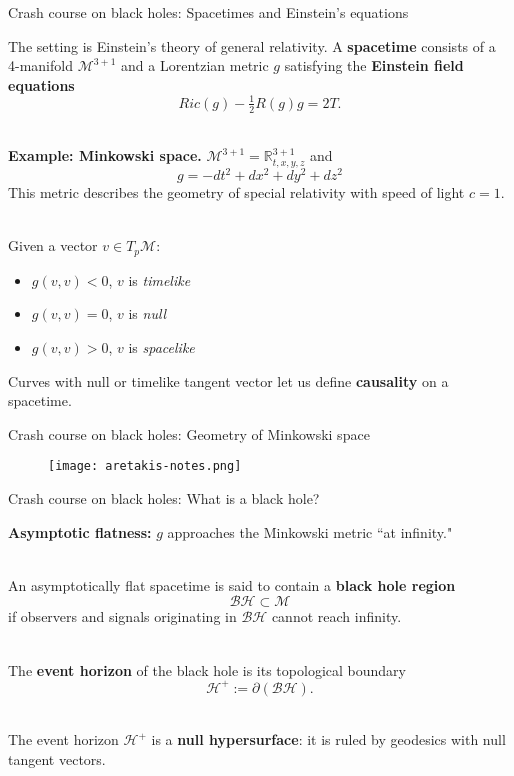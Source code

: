\documentclass[compress,usenames,dvipsnames,8pt]{beamer}
\theoremstyle{definition}
\renewcommand{\(}{\begin{columns}}
\renewcommand{\)}{\end{columns}}
\newcommand{\<}[1]{\begin{column}{#1}}
\renewcommand{\>}{\end{column}}
\begin{document}
\begin{frame}{Crash course on black holes: Spacetimes and Einstein's equations}

The setting is Einstein's theory of general relativity. A \textbf{spacetime} consists of a 4-manifold $\mathcal M^{3+1}$ and a Lorentzian metric $g$ satisfying the \textbf{Einstein field equations}
\begin{equation}
\tag{EFE} Ric(g)-\tfrac 12 R(g)g = 2T.
\end{equation}
\pause

~\\ 

\textbf{Example: Minkowski space.} $\mathcal M^{3+1}= \mathbb R^{3+1}_{t,x,y,z}$ and 
\[g=-dt^2 + dx^2 +dy^2 +dz^2\]
This metric describes the geometry of special relativity with speed of light $c=1$. 
\pause

~\\ 

Given a vector $v\in T_p\mathcal M$: 
\begin{itemize}
\item $g(v,v)<0$, $v$ is \emph{timelike}
\item $g(v,v)=0$, $v$ is \emph{null}
\item $g(v,v)> 0$, $v$ is \emph{spacelike}
\end{itemize}
Curves with null or timelike tangent vector let us define \textbf{causality} on a spacetime. 

\end{frame}



\begin{frame}{Crash course on black holes: Geometry of Minkowski space}
\begin{figure}
				\texttt{[image: aretakis-notes.png]}
			\end{figure}
\end{frame}



\begin{frame}{Crash course on black holes: What is a black hole?}

\textbf{Asymptotic flatness:}  $g$ approaches the Minkowski metric ``at infinity." \pause

~\\ 

An asymptotically flat spacetime is said to contain a \textbf{black hole region} \[\mathcal{BH}\subset\mathcal M\]
if observers and signals originating in $\mathcal{BH}$ cannot reach infinity. \pause

~\\ 

The \textbf{event horizon} of the black hole is its topological boundary
\[\mathcal H^+ := \partial(\mathcal{BH}).\] 


~\\

\pause The event horizon $\mathcal{H}^+$ is a \textbf{null hypersurface}: it is ruled by geodesics with null tangent vectors. \pause





\end{frame}
\end{document}
